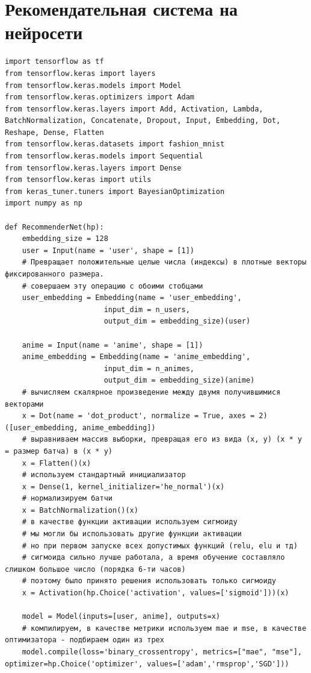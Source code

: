 \documentclass[bachelor, och, diploma]{SCWorks}
\begin{document}
\section{Рекомендательная система на нейросети}
\label{pr2}
\begin{verbatim}
import tensorflow as tf
from tensorflow.keras import layers
from tensorflow.keras.models import Model
from tensorflow.keras.optimizers import Adam
from tensorflow.keras.layers import Add, Activation, Lambda, BatchNormalization, Concatenate, Dropout, Input, Embedding, Dot, Reshape, Dense, Flatten
from tensorflow.keras.datasets import fashion_mnist
from tensorflow.keras.models import Sequential
from tensorflow.keras.layers import Dense
from tensorflow.keras import utils
from keras_tuner.tuners import BayesianOptimization
import numpy as np

def RecommenderNet(hp):
    embedding_size = 128
    user = Input(name = 'user', shape = [1])
    # Превращает положительные целые числа (индексы) в плотные векторы фиксированного размера.
    # совершаем эту операцию с обоими стобцами
    user_embedding = Embedding(name = 'user_embedding',
                       input_dim = n_users, 
                       output_dim = embedding_size)(user)
    
    anime = Input(name = 'anime', shape = [1])
    anime_embedding = Embedding(name = 'anime_embedding',
                       input_dim = n_animes, 
                       output_dim = embedding_size)(anime)
    # вычисляем скалярное произведение между двумя получившимися векторами
    x = Dot(name = 'dot_product', normalize = True, axes = 2)([user_embedding, anime_embedding])
    # выравниваем массив выборки, превращая его из вида (x, y) (x * y = размер батча) в (x * y)
    x = Flatten()(x)
    # используем стандартный инициализатор 
    x = Dense(1, kernel_initializer='he_normal')(x)
    # нормализируем батчи
    x = BatchNormalization()(x)
    # в качестве функции активации используем сигмоиду
    # мы могли бы использовать другие функции активации
    # но при первом запуске всех допустимых функций (relu, elu и тд)
    # сигмоида сильно лучше работала, а время обучение составляло слишком большое число (порядка 6-ти часов)
    # поэтому было принято решения использовать только сигмоиду
    x = Activation(hp.Choice('activation', values=['sigmoid']))(x)
    
    model = Model(inputs=[user, anime], outputs=x)
    # компилируем, в качестве метрики используем mae и mse, в качестве оптимизатора - подбираем один из трех
    model.compile(loss='binary_crossentropy', metrics=["mae", "mse"], optimizer=hp.Choice('optimizer', values=['adam','rmsprop','SGD']))
    

\end{verbatim}
\end{document}
